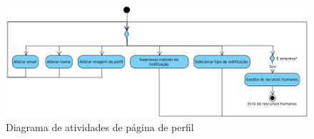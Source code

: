 \begin{figure}[htb]
    \centering
    \includegraphics[width=\textwidth]{images/diagramas/atividades/diagrama_atividades_perfil.png}
    \caption{Diagrama de atividades de página de perfil}
    \label{fig:28}
\end{figure}









